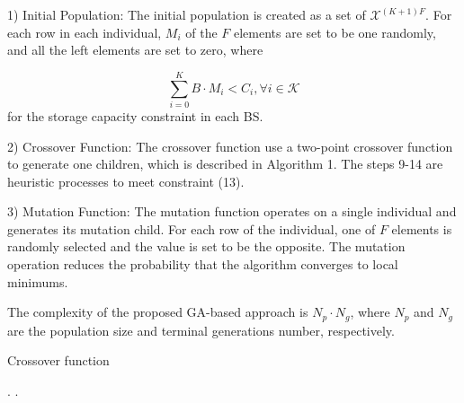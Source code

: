 \documentclass[conference]{IEEEtran}
\begin{document}
1)	Initial Population: The initial population is created as a set of $\mathcal{X}^{(K+1)F}$. For each row in each individual, $M_i$ of the $F$ elements are set to be one randomly, and all the left elements are set to zero, where

\begin{equation}
\sum_{i=0}^K B\cdot M_i <C_i, \forall{i}\in\mathcal{K}
\end{equation}
for the storage capacity constraint in each BS.

2)	Crossover Function: The crossover function use a two-point crossover function to generate one children, which is described in Algorithm 1. The steps 9-14 are heuristic processes to meet constraint (13).

3)	Mutation Function: The mutation function operates on a single individual and generates its mutation child. For each row of the individual, one of $F$ elements is randomly selected and the value is set to be the opposite. The mutation operation reduces the probability that the algorithm converges to local minimums.

The complexity of the proposed GA-based approach is $N_p\cdot N_g$, where $ N_p$ and $N_g$ are the population size and terminal generations number, respectively.

\begin{algorithm}[htb]
 \caption{Crossover function}
 \label{alg:admission}
 \begin{algorithmic}[1] %
  \ELSE
  \ENDIF
{}
.
\ENDWHILE
{}
.
\ENDWHILE
  \ENDFOR
 \end{algorithmic}
\end{algorithm}
\end{document}
